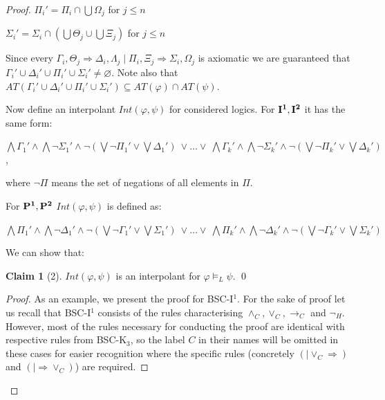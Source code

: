 \documentclass[11pt,a4paper,titlepage]{article}
\theoremstyle{definition}
\newtheorem{claim}{Claim}[section]
\newcommand{\3}{\vspace{.3in}}
\newcommand{\2}{\vspace{.2in}}
\newcommand{\1}{\vspace{.1in}}
\newcommand{\5}{\vspace{.05in}}
\begin{document}
\begin{proof}
$\Pi_i' = \Pi_i\cap\bigcup\Omega_j$ for $j\leq n$

$\Sigma_i' = \Sigma_i\cap (\bigcup\Theta_j\cup\bigcup\Xi_j)$ for $j\leq n$

\1

Since every
$\Gamma_i, \Theta_j\Rightarrow\Delta_i, \Lambda_j\mid\Pi_i, \Xi_j\Rightarrow\Sigma_i, \Omega_j$ is axiomatic we are guaranteed that $\Gamma_i'\cup\Delta_i'\cup\Pi_i'\cup\Sigma_i'\neq \varnothing$.
Note also that $AT(\Gamma_i'\cup\Delta_i'\cup\Pi_i'\cup\Sigma_i') \subseteq AT(\varphi)\cap AT(\psi)$.



Now define an interpolant $Int(\varphi, \psi)$ for considered logics. For ${\bf I^1, I^2}$  it has the same form:

\1

\noindent $\bigwedge\Gamma_1' \wedge \bigwedge\neg\Sigma_1'\wedge \neg(\bigvee\neg\Pi_1'\vee\bigvee\Delta_1') \ \vee \ldots \vee \ \bigwedge\Gamma_k' \wedge \bigwedge\neg\Sigma_k'\wedge \neg(\bigvee\neg\Pi_k'\vee\bigvee\Delta_k')$, 

\1

\noindent where $\neg\Pi$ means the set of negations of all elements in $\Pi$.

\1

For ${\bf P^1, P^2}$ $Int(\varphi, \psi)$ is defined as:

\1

$\bigwedge\Pi_1' \wedge \bigwedge\neg\Delta_1'\wedge \neg(\bigvee\neg\Gamma_1'\vee\bigvee\Sigma_1') \ \vee \ldots \vee \ \bigwedge\Pi_k' \wedge \bigwedge\neg\Delta_k'\wedge \neg(\bigvee\neg\Gamma_k'\vee\bigvee\Sigma_k')$


\1

We can show that:

\begin{claim}[2]
	$Int(\varphi, \psi)$ is an interpolant for $\varphi\models_L\psi$. \qed
\end{claim}
\begin{proof}
As an example, we present the proof for BSC-I$^1$.  For the sake of proof let us recall that BSC-I$^1$ consists of the rules characterising $\wedge_C, \vee_C, \rightarrow_C$ and $\neg_H$. However, most of the rules necessary for conducting the proof are identical with respective rules from BSC-K$_3$, so the label $C$ in their names will be omitted in these cases for easier recognition where the specific rules (concretely  $(\mid\vee_C\Rightarrow)$ and $(\mid\Rightarrow\vee_C)$) are required.


\end{proof}
\end{proof}
\end{document}
